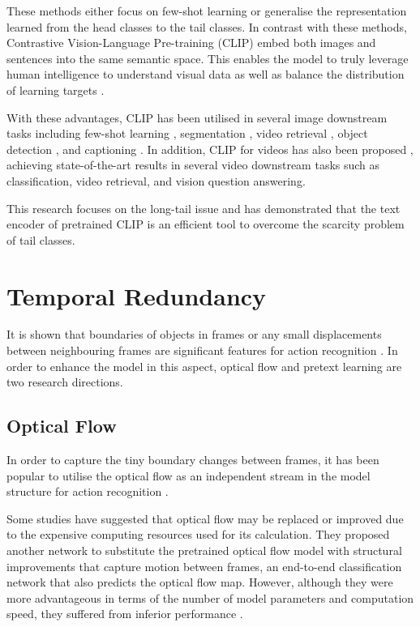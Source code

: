 These methods either focus on few-shot learning or generalise the representation learned from the head classes to the tail classes. In contrast with these methods, Contrastive Vision-Language Pre-training (CLIP) \parencite{radford2021learning} embed both images and sentences into the same semantic space. This enables the model to truly leverage human intelligence to understand visual data as well as balance the distribution of learning targets \parencite{ma2022x}. 

With these advantages, CLIP has been utilised in several image downstream tasks including few-shot learning \parencite{zhang2022tip}, segmentation \parencite{wang2022cris}, video retrieval \parencite{ma2022x}, object detection \parencite{lin2023gridclip}, and captioning \parencite{mokady2021clipcap}. In addition, CLIP for videos has also been proposed \parencite{xu-etal-2021-videoclip, wang2022internvideo}, achieving state-of-the-art results in several video downstream tasks such as classification, video retrieval, and vision question answering.

This research focuses on the long-tail issue and has demonstrated that the text encoder of pretrained CLIP is an efficient tool to overcome the scarcity problem of tail classes.


\section{Temporal Redundancy}
It is shown that boundaries of objects in frames or any small displacements between neighbouring frames are significant features for action recognition \parencite{10.1007/978-3-030-12939-2_20}. In order to enhance the model in this aspect, optical flow and pretext learning are two research directions. 

\subsection{Optical Flow}
In order to capture the tiny boundary changes between frames, it has been popular to utilise the optical flow as an independent stream in the model structure for action recognition \parencite{Piergiovanni_2019_CVPR}. 

Some studies have suggested that optical flow may be replaced or improved due to the expensive computing resources used for its calculation. They proposed another network to substitute the pretrained optical flow model with structural improvements that capture motion between frames, an end-to-end classification network that also predicts the optical flow map. However, although they were more advantageous in terms of the number of model parameters and computation speed, they suffered from inferior performance \parencite{Lee_2018_ECCV, 8354283, Piergiovanni_2019_CVPR}.

